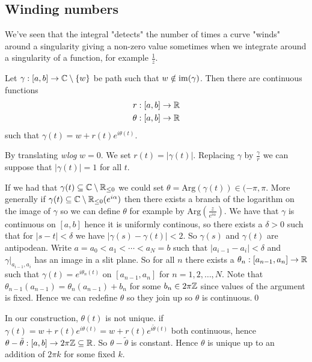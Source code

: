\documentclass{article}
\newcommand{\Arg}{\mathrm{Arg}}
\begin{document}
\subsection{Winding numbers}
We've seen that the integral "detects" the number of times a curve "winds" around a singularity giving a non-zero value sometimes when we integrate around a singularity of a function, for example $ \frac 1z $.
\begin{lemma}
	Let $ \gamma:[a,b] \to\mathbb{C}\setminus \{w\} $ be path such that $ w\notin\operatorname{im}(\gamma) $. Then there are continuous functions
	\begin{align*}
		r &:[a,b]\to \mathbb{R} \\
		\theta &: [a,b] \to \mathbb{R}
	\end{align*}
	such that $ \gamma(t) = w + r(t)e^{i\theta(t)} $.
\end{lemma}
\pf By translating \textit{wlog} $ w=0 $. We set $ r(t) = |\gamma(t)| $. Replacing $ \gamma $ by $ \frac{\gamma}r $ we can suppose that $ |\gamma(t)| = 1 $ for all $ t $.\par
If we had that $ \gamma(t) \subseteq \mathbb{C}\setminus \mathbb{R}_{\le 0} $ we could set $ \theta = \Arg(\gamma(t)) \in (-\pi ,\pi $. More generally if $ \gamma(t)\subseteq \mathbb{C}\setminus \mathbb{R}_{\le 0}(e^{i\alpha}) $ then there exists a branch of the logarithm on the image of $ \gamma $ so we can define $ \theta $ for example by $ \Arg\left(\frac z{e^{i\alpha}}\right) $. We have that $ \gamma $ is continuous on $ [a,b] $ hence it is uniformly continous, so there exists a $ \delta>0 $ such that for $ |s-t|<\delta $ we have $ |\gamma(s)-\gamma(t)|<2 $. So $ \gamma(s) $ and $ \gamma(t) $ are antipodean. Write $ a = a_0 <a_1<\cdots < a_N = b $ such that $ |a_{i-1} - a_i|<\delta $ and $ \left.\gamma\right|_{a_{i-1},a_i} $ has an image in a slit plane. So for all $ n $ there exists a $ \theta_n:[a_{n-1},a_n]\to \mathbb{R} $ such that $ \gamma(t) = e^{i\theta_n(t)} $ on $ [a_{n-1},a_n] $ for $ n=1,2,\dots, N $. Note that $ \theta_{n-1}(a_{n-1}) = \theta_n(a_{n-1})+b_n $ for some $ b_n \in 2\pi \mathbb{Z} $ since values of the argument is fixed. Hence we can redefine $ \theta $ so they join up so $ \theta $ is continuous.\qed
\begin{remark}
	In our construction, $ \theta(t) $ is not unique. if $ \gamma(t) = w+r(t)e^{i\theta(t)}= w+r(t)e^{i\tilde\theta(t)} $ both continuous, hence $ \theta-\tilde\theta:[a,b]\to 2\pi \mathbb{Z} \subseteq \mathbb{R} $. So $ \theta-\tilde\theta $ is constant. Hence $ \theta $ is unique up to an addition of $ 2\pi k $ for some fixed $ k $.
\end{remark}
\end{document}
